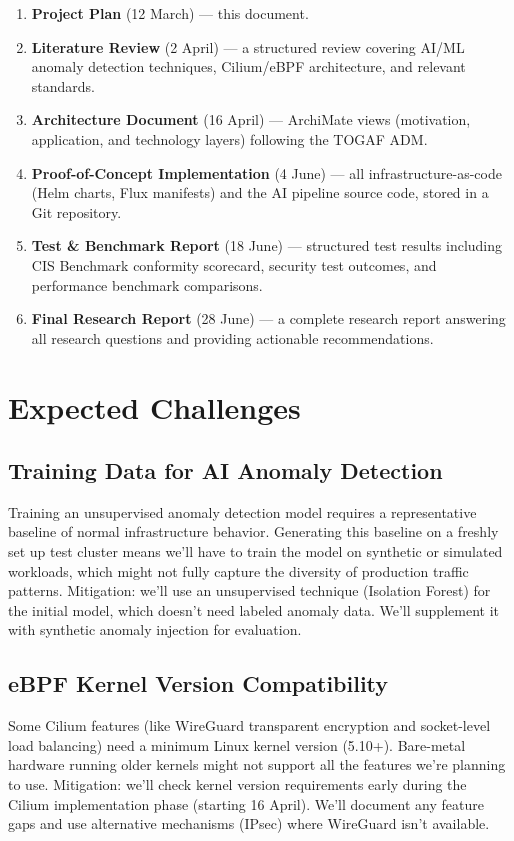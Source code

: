\begin{enumerate}
    \item \textbf{Project Plan} (12 March) --- this document.
    \item \textbf{Literature Review} (2 April) --- a structured review covering AI/ML anomaly detection techniques, Cilium/eBPF architecture, and relevant standards.
    \item \textbf{Architecture Document} (16 April) --- ArchiMate views (motivation, application, and technology layers) following the TOGAF ADM.
    \item \textbf{Proof-of-Concept Implementation} (4 June) --- all infrastructure-as-code (Helm charts, Flux manifests) and the AI pipeline source code, stored in a Git repository.
    \item \textbf{Test \& Benchmark Report} (18 June) --- structured test results including CIS Benchmark conformity scorecard, security test outcomes, and performance benchmark comparisons.
    \item \textbf{Final Research Report} (28 June) --- a complete research report answering all research questions and providing actionable recommendations.
\end{enumerate}

\section{Expected Challenges}

\subsection{Training Data for AI Anomaly Detection}

Training an unsupervised anomaly detection model requires a representative baseline of normal infrastructure behavior. Generating this baseline on a freshly set up test cluster means we'll have to train the model on synthetic or simulated workloads, which might not fully capture the diversity of production traffic patterns. Mitigation: we'll use an unsupervised technique (Isolation Forest) for the initial model, which doesn't need labeled anomaly data. We'll supplement it with synthetic anomaly injection for evaluation.

\subsection{eBPF Kernel Version Compatibility}

Some Cilium features (like WireGuard transparent encryption and socket-level load balancing) need a minimum Linux kernel version (5.10+). Bare-metal hardware running older kernels might not support all the features we're planning to use. Mitigation: we'll check kernel version requirements early during the Cilium implementation phase (starting 16 April). We'll document any feature gaps and use alternative mechanisms (IPsec) where WireGuard isn't available.

